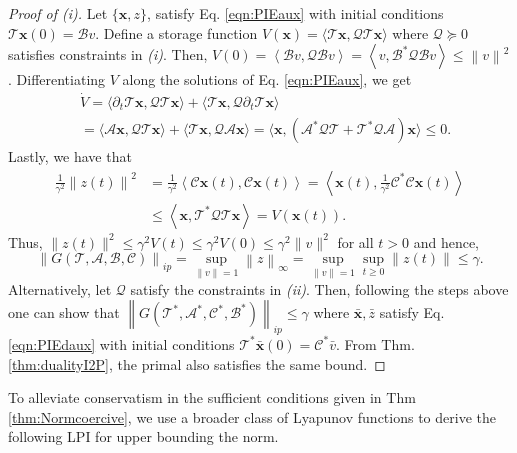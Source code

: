 \documentclass[letterpaper, 10 pt, conference]{ieeeconf}
\newcommand{\ip}[2]{\left\langle #1,#2\right\rangle}
\newcommand{\mcl}[1]{\mathcal{#1}}
\newcommand{\mbf}[1]{\mathbf{#1}}
\newcommand{\norm}[1]{\left\lVert #1 \right\rVert}
\theoremstyle{definition}
\begin{document}
\begin{proof}[Proof of (i)]
     Let $\{\mbf x, z\}$, satisfy Eq. \eqref{eqn:PIEaux} with initial conditions $\mcl T\mbf x(0) = \mcl Bv$. Define a storage function $V(\mbf x) = \langle\mathcal{T}\mbf x, \mcl Q\mathcal{T}\mbf x\rangle$ where $\mcl Q\succeq 0$ satisfies constraints in \textit{(i)}. Then, $V(0) = \ip{\mcl B v}{\mcl Q\mcl Bv} = \ip{v}{\mcl B^*\mcl Q\mcl B v} \leq \norm{v}^2$. Differentiating $V$ along the solutions of Eq. \eqref{eqn:PIEaux}, we get 
\begin{align*}
&\dot{V} = \langle \partial_t \mathcal{T}\mbf x, \mcl Q \mathcal{T}\mbf x\rangle+\langle \mathcal{T}\mbf x, \mcl Q \partial_t \mathcal{T}\mbf x\rangle\\
&= \langle \mathcal{A}\mbf x, \mcl Q \mathcal{T}\mbf x\rangle\!+\!\langle \mathcal{T}\mbf x, \mcl Q \mathcal{A}\mbf x\rangle \!\! =\!\! \langle \mbf x, (\mathcal{A}^* \mcl Q \mathcal{T}\!+\!\mathcal{T}^*\mcl Q\mathcal{A})\mbf x\rangle\!\le\! 0.    
\end{align*}
Lastly, we have that 
\begin{align*}
\frac{1}{\gamma^2}\norm{z(t)}^2&=\frac{1}{\gamma^2}\ip{\mcl C\mbf x(t)}{\mcl C\mbf x(t)}=\ip{\mbf x(t)}{\frac{1}{\gamma^2}\mcl C^*\mcl C\mbf x(t)}\\
&\le\ip{\mbf x}{\mcl T^*\mcl Q\mcl T\mbf x} = V(\mbf x(t)).
\end{align*}
Thus, $\lVert z(t) \rVert^2 \leq \gamma^2 V(t) \leq \gamma^2 V(0) \leq \gamma^2 \lVert v\rVert^2$ for all $t>0$ and hence, 
\[
\norm{G(\mcl T,\mcl A,\mcl B,\mcl C)}_{ip}=\sup_{\norm{v}=1}\norm{z}_\infty=\sup_{\lVert v\rVert = 1} \sup_{t\geq 0} \lVert z(t) \rVert \leq \gamma.\]
Alternatively, let $\mcl Q$ satisfy the constraints in \textit{(ii)}. Then, following the steps above one can show that $\norm{G(\mcl T^*,\mcl A^*,\mcl C^*,\mcl B^*)}_{ip}\le \gamma$ where $\bar{\mbf x}, \bar z$ satisfy Eq. \eqref{eqn:PIEdaux} with initial conditions $\mcl T^*\bar{\mbf x}(0)=\mcl C^*\bar v$. From Thm. \ref{thm:dualityI2P}, the primal also satisfies the same bound.
\end{proof}


To alleviate conservatism in the sufficient conditions given in Thm \ref{thm:Normcoercive}, we use a broader class of Lyapunov functions to derive the following LPI for upper bounding the norm. 
\end{document}
